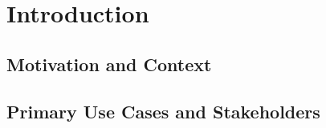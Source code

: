 \documentclass[a4paper,twoside]{sapthesis}
\begin{document}



\tableofcontents



\mainmatter


\chapter{Introduction}
\label{ch:introduction}


\section{Motivation and Context}
\label{sec:motivation}

\section{Primary Use Cases and Stakeholders}
\label{sec:use-cases-stakeholders}
\end{document}
